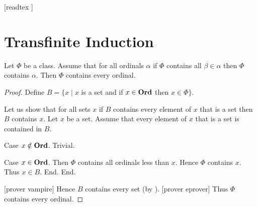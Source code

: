 \documentclass[10pt]{article}
\begin{document}
  \begin{imports}
    \begin{forthel}
      [readtex ]
    \end{forthel}
  \end{imports}


  \section*{Transfinite Induction}

  \begin{forthel}
    \begin{theorem}
      Let $\Phi$ be a class.
      Assume that for all ordinals $\alpha$ if $\Phi$ contains all $\beta \in \alpha$ then $\Phi$ contains $\alpha$.
      Then $\Phi$ contains every ordinal.
    \end{theorem}
    \begin{proof}
      Define $B = \{ x \mid x$ is a set and if $x \in \textbf{Ord}$ then $x \in \Phi \}$.

      Let us show that for all sets $x$ if $B$ contains every element of $x$ that is a set then $B$ contains $x$.
        Let $x$ be a set.
        Assume that every element of $x$ that is a set is contained in $B$.

        Case $x \notin \textbf{Ord}$. Trivial.

        Case $x \in \textbf{Ord}$.
          Then $\Phi$ contains all ordinals less than $x$.
          Hence $\Phi$ contains $x$.
          Thus $x \in B$.
        End.
      End.

      [prover vampire]
      Hence $B$ contains every set (by ).
      [prover eprover]
      Thus $\Phi$ contains every ordinal.
    \end{proof}
  \end{forthel}
\end{document}
